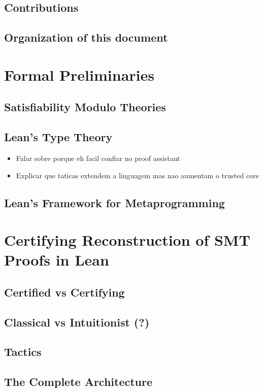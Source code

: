 \documentclass[
	msc,
	english
]{ppgccufmg}
\begin{document}
	  \section{Contributions}
	    
	  \section{Organization of this document}
	    
	\chapter{Formal Preliminaries}
	  \section{Satisfiability Modulo Theories}
	  \section{Lean's Type Theory}
	    \begin{itemize}
	      \item Falar sobre porque eh facil confiar no proof assistant
		  \item Explicar que taticas extendem a linguagem mas nao aumentam o trusted core
	    \end{itemize}
	  \section{Lean's Framework for Metaprogramming}
	\chapter{Certifying Reconstruction of SMT Proofs in Lean}
	  \section{Certified vs Certifying}
      \label{sec:certifiedVsCertifying}
	  \section{Classical vs Intuitionist (?)}
	  \section{Tactics}
	  \section{The Complete Architecture}
\end{document}
